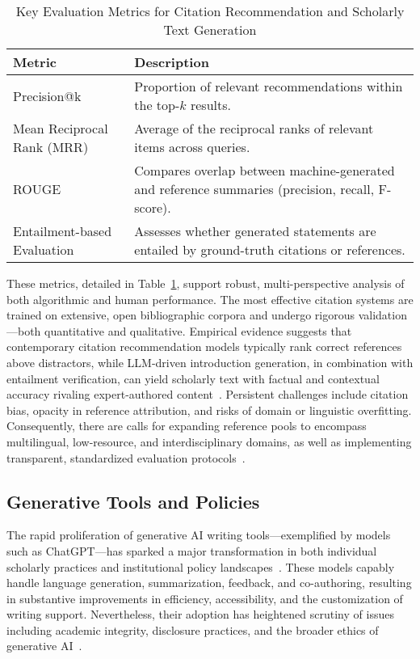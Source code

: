 \documentclass[11pt]{article}
\begin{document}
\begin{table}[ht]
\centering
\caption{Key Evaluation Metrics for Citation Recommendation and Scholarly Text Generation}
\label{tab:evaluation_metrics}
\begin{tabular}{|l|p{9cm}|}
\hline
\textbf{Metric} & \textbf{Description} \\
\hline
Precision@k & Proportion of relevant recommendations within the top-$k$ results. \\
\hline
Mean Reciprocal Rank (MRR) & Average of the reciprocal ranks of relevant items across queries. \\
\hline
ROUGE & Compares overlap between machine-generated and reference summaries (precision, recall, F-score). \\
\hline
Entailment-based Evaluation & Assesses whether generated statements are entailed by ground-truth citations or references. \\
\hline
\end{tabular}
\end{table}

These metrics, detailed in Table~\ref{tab:evaluation_metrics}, support robust, multi-perspective analysis of both algorithmic and human performance. The most effective citation systems are trained on extensive, open bibliographic corpora and undergo rigorous validation—both quantitative and qualitative. Empirical evidence suggests that contemporary citation recommendation models typically rank correct references above distractors, while LLM-driven introduction generation, in combination with entailment verification, can yield scholarly text with factual and contextual accuracy rivaling expert-authored content~\cite{107}. Persistent challenges include citation bias, opacity in reference attribution, and risks of domain or linguistic overfitting. Consequently, there are calls for expanding reference pools to encompass multilingual, low-resource, and interdisciplinary domains, as well as implementing transparent, standardized evaluation protocols~\cite{107}.

\subsection{Generative Tools and Policies}

The rapid proliferation of generative AI writing tools—exemplified by models such as ChatGPT—has sparked a major transformation in both individual scholarly practices and institutional policy landscapes~\cite{104,109,110}. These models capably handle language generation, summarization, feedback, and co-authoring, resulting in substantive improvements in efficiency, accessibility, and the customization of writing support. Nevertheless, their adoption has heightened scrutiny of issues including academic integrity, disclosure practices, and the broader ethics of generative AI~\cite{104,109}.
\end{document}
